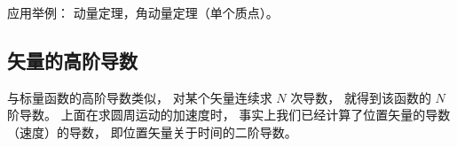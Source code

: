 应用举例： 动量定理，角动量定理（单个质点）。

\subsection{矢量的高阶导数}
与标量函数的高阶导数类似， 对某个矢量连续求 $N$ 次导数， 就得到该函数的 $N$ 阶导数。 上面在求圆周运动的加速度时， 事实上我们已经计算了位置矢量的导数（速度）的导数， 即位置矢量关于时间的二阶导数。
